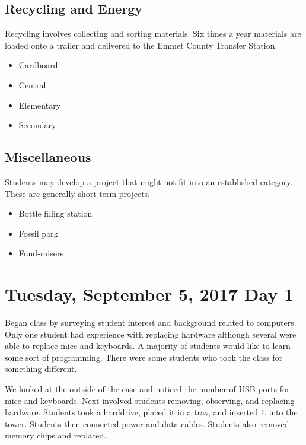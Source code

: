 \documentclass[letterpaper,10pt]{memoir}
\begin{document}
\subsection*{Recycling and Energy}

Recycling involves collecting and sorting materials. Six times a year materials are loaded onto a trailer and delivered to the Emmet County Transfer Station.

\begin{multicols}{2}
\begin{itemize}[label=$-$,parsep=0pt]
\item Cardboard
\item Central
\item Elementary
\item Secondary
\end{itemize}
\end{multicols}


\subsection*{Miscellaneous}

Students may develop a project that might not fit into an established category. These are generally short-term projects.

\begin{multicols}{2}
\begin{itemize}[label=$-$,parsep=0pt]
\item Bottle filling station
\item Fossil park
\item Fund-raisers
\end{itemize}
\end{multicols}


\newpage
\section*{Tuesday, September 5, 2017 \hfill Day 1}

	Began class by surveying student interest and background related to computers. Only one student had experience with replacing hardware although several were able to replace mice and keyboards. A majority of students would like to learn some sort of programming. There were some students who took the class for something different.

	We looked at the outside of the case and noticed the number of USB ports for mice and keyboards.  Next involved students removing, observing, and replacing hardware. Students took a harddrive, placed it in a tray, and inserted it into the tower. Students then connected power and data cables. Students also removed memory chips and replaced.
\end{document}
